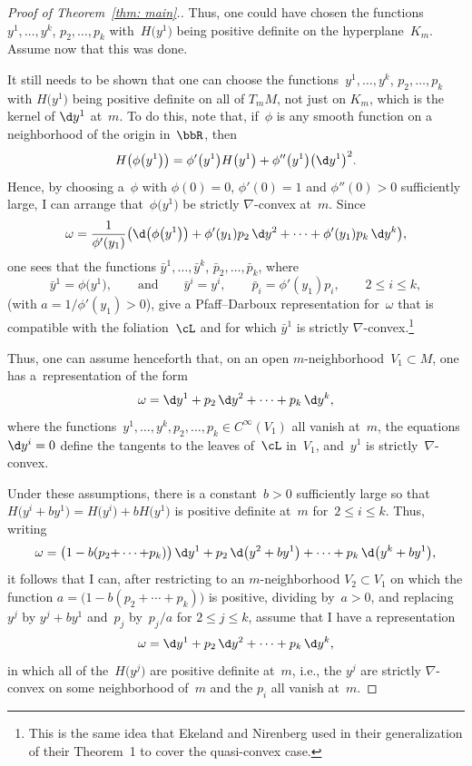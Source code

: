 \begin{proof}[Proof of Theorem~\ref{thm: main}.]
Thus, one could have chosen the functions~$y^1,\ldots,y^k$, $p_2,\ldots,p_k$
with~$H\big(y^1\big)$ being positive definite on the hyperplane~$K_m$.
Assume now that this was done.

It still needs to be shown that one can choose
the functions~$y^1,\ldots,y^k$, $p_2,\ldots,p_k$
with $H\big(y^1\big)$ being positive definite on all of $T_mM$,
not just on $K_m$, which is the kernel of $\d y^1$ at~$m$.
To do this, note that, if~$\phi$ is any smooth function on a neighborhood
of the origin in~$\bbR$, then
\[
H\bigl(\phi\big(y^1\big)\bigr) = \phi'\big(y^1\big) H\big(y^1\big) + \phi''\big(y^1\big) \big(\d y^1\big)^2.
\]
Hence, by choosing a~$\phi$ with $\phi(0)=0$, $\phi'(0)=1$
and $\phi''(0)>0$ sufficiently large,
I can arrange that~$\phi\big(y^1\big)$ be strictly $\nabla$-convex at~$m$.
Since
\[
\omega = \frac{1}{\phi'(y_1)} \big(\d\bigl(\phi\big(y^1\big)\bigr)
    + \phi'(y_1)p_2\,\d y^2 +\cdots + \phi'(y_1)p_k\,\d y^k\big),
\]
one sees that the functions
$\bar y^1,\ldots,\bar y^k$, $\bar p_2,\ldots,\bar p_k$, where
\[
\bar y^1 = \phi\big(y^1\big),
\qquad\text{and}\qquad
\bar y^i = y^i,
\qquad
\bar p_i = \phi'(y_1)p_i,\qquad 2\le i\le k,
\]
(with $a = 1/\phi'(y_1) >0$), give a Pfaff--Darboux representation
for~$\omega$ that is compatible with the foliation~$\cL$ and
for which $\bar y^1$ is strictly $\nabla$-convex.\footnote{This is the same idea that Ekeland and Nirenberg \cite{MR2023129}
used in their generalization of their Theorem~1
to cover the quasi-convex case.}

Thus, one can assume henceforth that,
on an open $m$-neighborhood~$V_1\subset M$,
one has a~representation of the form
\[
\omega = \d y^1 + p_2\,\d y^2 +\cdots + p_k\,\d y^k,
\]
where the functions~$y^1,\ldots,y^k,p_2,\ldots,p_k\in C^\infty(V_1)$
all vanish at~$m$,
the equations $\d y^i=0$ define the tangents to the leaves of~$\cL$ in~$V_1$,
and~$y^1$ is strictly~$\nabla$-convex.

Under these assumptions, there is a constant~$b>0$ sufficiently large
so that $H\big(y^i+by^1\big) = H\big(y^i\big)+b H\big(y^1\big)$ is positive definite at~$m$
for~$2\le i\le k$.
Thus, writing
\[
\omega = \bigl(1-b(p_2{+}\cdots{+}p_k)\bigr)\,\d y^1 + p_2\,\d\big(y^2+b y^1\big)
   + \cdots + p_k\,\d\big(y^k+b y^1\big),
\]
it follows that I can,
after restricting to an $m$-neighborhood $V_2\subset V_1$ on which
the function $a = \bigl(1-b(p_2{+}\cdots{+}p_k)\bigr)$ is positive,
dividing by~$a>0$,
and replacing~$y^j$ by $y^j+by^1$ and~$p_j$ by~$p_j/a$ for $2\le j\le k$,
assume that I have a representation
\[
\omega = \d y^1 + p_2\,\d y^2 +\cdots + p_k\,\d y^k,
\]
in which all of the~$H\big(y^j\big)$ are positive definite at~$m$,
i.e., the $y^j$ are strictly $\nabla$-convex on some neighborhood of~$m$
and the $p_i$ all vanish at~$m$.


\end{proof}
